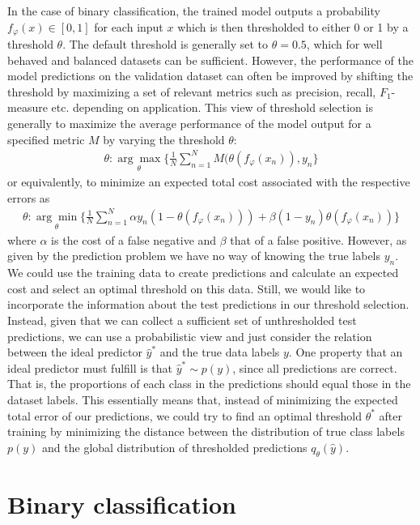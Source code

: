 \documentclass{article}
\begin{document}
In the case of binary classification, the trained model outputs a probability $f_\varphi (x) \in [0, 1]$ for each input $x$ which is then thresholded to either 0 or 1 by a threshold $\theta$. The default threshold is generally set to $\theta = 0.5$, which for well behaved and balanced datasets can be sufficient. However, the performance of the model predictions on the validation dataset can often be improved by shifting the threshold by maximizing a set of relevant metrics such as precision, recall, $F_1$-measure etc. depending on application. This view of threshold selection is generally to maximize the average performance of the model output for a specified metric $M$ by varying the threshold $\theta$:
\begin{align}
    \theta : \underset{\theta}{\arg\max}\{\frac{1}{N} \sum_{n=1}^N M(\theta(f_\varphi(x_n)), y_n\}
\end{align}
or equivalently, to minimize an expected total cost associated with the respective errors as
\begin{align}
	\label{eq:cost}
    \theta : \underset{\theta}{\arg\min}\{\frac{1}{N} \sum_{n=1}^N \alpha y_n (1-\theta(f_\varphi(x_n)) )+ \beta (1-y_n) \theta(f_\varphi(x_n))\}
\end{align}
where $\alpha$ is the cost of a false negative and $\beta$ that of a false positive. However, as given by the prediction problem we have no way of knowing the true labels $y_n$. We could use the training data to create predictions and calculate an expected cost and select an optimal threshold on this data. Still, we would like to incorporate the information about the test predictions in our threshold selection. %
Instead, given that we can collect a sufficient set of unthresholded test predictions, we can use a probabilistic view and just consider the relation between the ideal predictor $\hat{y}^*$ and the true data labels $y$. One property that an ideal predictor must fulfill is that $\hat{y}^* \sim p(y)$, since all predictions are correct. That is, the proportions of each class in the predictions should equal those in the dataset labels. This essentially means that, instead of minimizing the expected total error of our predictions, we could try to find an optimal threshold $\theta^*$ after training by minimizing the distance between the distribution of true class labels $p(y)$ and the global distribution of thresholded predictions $q_\theta(\hat{y})$.

\section{Binary classification}
\end{document}
